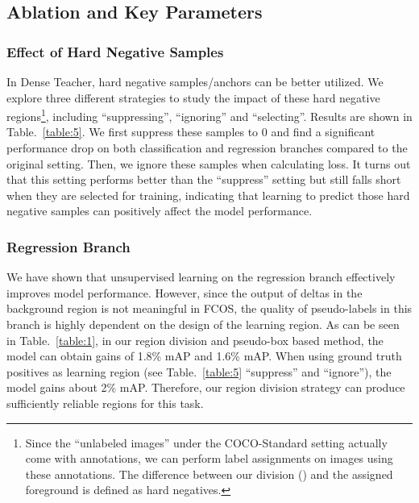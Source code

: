 \documentclass[runningheads]{llncs}
\begin{document}
\subsection{Ablation and Key Parameters}\label{sec4_4}




\subsubsection{Effect of Hard Negative Samples}
\label{sec:HN}
In Dense Teacher, hard negative samples/anchors can be better utilized. We explore three different strategies to study the impact of these hard negative regions\footnote{Since the ``unlabeled images'' under the COCO-Standard setting actually come with annotations, we can perform label assignments on images using these annotations. The difference between our division () and the assigned foreground is defined as hard negatives.}, including ``suppressing'', ``ignoring'' and ``selecting''. Results are shown in Table.~\ref{table:5}. We first suppress these samples to 0 and find a significant performance drop on both classification and regression branches compared to the original setting. Then, we ignore these samples when calculating loss. It turns out that this setting performs better than the ``suppress'' setting but still falls short when they are selected for training, indicating that learning to predict those hard negative samples can positively affect the model performance.

\subsubsection{Regression Branch} \label{sec:reg}
We have shown that unsupervised learning on the regression branch effectively improves model performance. However, since the output of deltas in the background region is not meaningful in FCOS, the quality of pseudo-labels in this branch is highly dependent on the design of the learning region. As can be seen in Table.~\ref{table:1}, in our region division and pseudo-box based method, the model can obtain gains of 1.8\% mAP and 1.6\% mAP. When using ground truth positives as learning region (see Table.~\ref{table:5} ``suppress'' and ``ignore''), the model gains about 2\% mAP. Therefore, our region division strategy can produce sufficiently reliable regions for this task.
\end{document}
